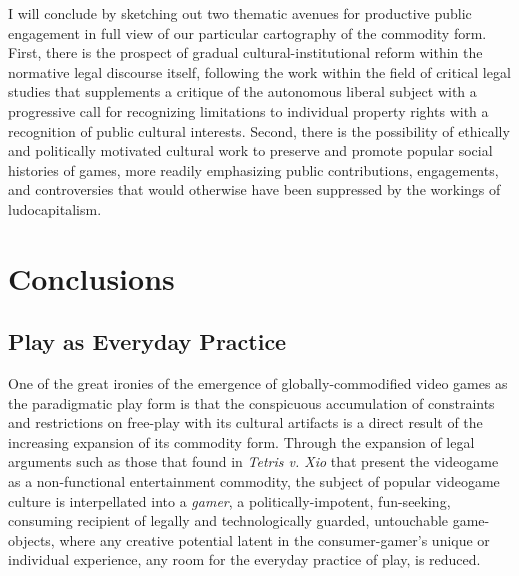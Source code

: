 I will conclude by sketching out two thematic avenues for productive public engagement in full view of our particular cartography of the commodity form. First, there is the prospect of gradual cultural-institutional reform within the normative legal discourse itself, following the work within the field of critical legal studies that supplements a critique of the autonomous liberal subject with a progressive call for recognizing limitations to individual property rights with a recognition of public cultural interests. Second, there is the possibility of ethically and politically motivated cultural work to preserve and promote popular social histories of games, more readily emphasizing public contributions, engagements, and controversies that would otherwise have been suppressed by the workings of ludocapitalism.

\section{Conclusions}
\subsection*{Play as Everyday Practice}
One of the great ironies of the emergence of globally-commodified video games as the paradigmatic play form is that the conspicuous accumulation of constraints and restrictions on free-play with its cultural artifacts is a direct result of the increasing expansion of its commodity form. Through the expansion of legal arguments such as those that found in \emph{Tetris v. Xio} that present the videogame as a non-functional entertainment commodity, the subject of popular videogame culture is interpellated into a \emph{gamer}, a politically-impotent, fun-seeking, consuming recipient of legally and technologically guarded, untouchable game-objects, where any creative potential latent in the consumer-gamer's unique or individual experience, any room for the everyday practice of play, is reduced.

